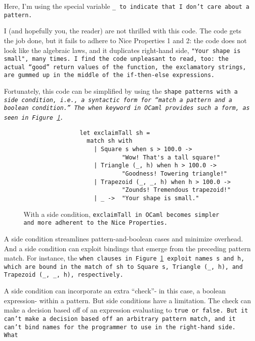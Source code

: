 \documentclass[manuscript,screen,review, 12pt, nonacm]{acmart}
\begin{document}
\begin{outline}[enumerate]
    Here, I'm using the special variable \tt{\_} to indicate that I don't care
    about a pattern. 

    I (and hopefully you, the reader) are not thrilled with this code. The code
    gets the job done, but it fails to adhere to Nice Properties 1 and 2: the
    code does not look like the algebraic laws, and it duplicates right-hand
    side, \tt{"Your shape is small"}, many times. I find the code unpleasant to
    read, too: the actual “good” return values of the function, the exclamatory
    strings, are gummed up in the middle of the \tt{if-then-else} expressions.
    
    Fortunately, this code can be simplified by using the \tt{shape} patterns
    with a \it{side condition}, i.e., a syntactic form for “match a pattern
    \it{and} a boolean condition.” The \tt{when} keyword in OCaml provides such
    a form, as seen in Figure~\ref{fig:whenexclaimtall}.
        
        \begin{figure}[ht]
            \begin{verbatim}
                let exclaimTall sh =
                  match sh with 
                    | Square s when s > 100.0 ->
                            "Wow! That's a tall square!"
                    | Triangle (_, h) when h > 100.0 ->
                            "Goodness! Towering triangle!"
                    | Trapezoid (_, _, h) when h > 100.0 -> 
                            "Zounds! Tremendous trapezoid!"
                    | _ ->  "Your shape is small." 
                \end{verbatim}
            \caption{With a side condition, \tt{exclaimTall} in OCaml becomes
            simpler and more adherent to the Nice Properties.} 
            \label{fig:whenexclaimtall}
        \end{figure}

    
    A side condition streamlines pattern-and-boolean cases and minimize
    overhead. And a side condition can exploit bindings that emerge from the
    preceding pattern match. For instance, the \tt{when} clauses in
    Figure~\ref{fig:whenexclaimtall} exploit names \tt{s} and \tt{h}, which are
    bound in the match of \tt{sh} to \tt{Square s}, \tt{Triangle (\_, h)}, and
    \tt{Trapezoid (\_, \_, h)}, respectively. 

    A side condition can incorporate an extra “check”- in this case, a boolean
    expression- within a pattern. But side conditions have a limitation. The
    check can make a decision based off of an expression evaluating to \tt{true}
    or \tt{false}. But it can't make a decision based off an arbitrary pattern
    match, and it can't bind names for the programmer to use in the right-hand
    side. What 
    

\end{outline}
\end{document}
